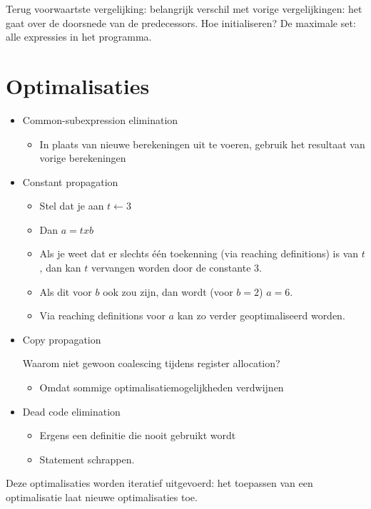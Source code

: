 Terug voorwaartste vergelijking: belangrijk verschil met vorige vergelijkingen: het gaat over de doorsnede van de predecessors. Hoe initialiseren? De maximale set: alle expressies in het programma.

\section{Optimalisaties}
\begin{itemize}
	\item Common-subexpression elimination
	\begin{itemize}
		\item In plaats van nieuwe berekeningen uit te voeren, gebruik het resultaat van vorige berekeningen
	\end{itemize}
	\item Constant propagation
	\begin{itemize}
		\item Stel dat je aan $t \leftarrow 3$
		\item Dan $a = t x b$
		\item Als je weet dat er slechts één toekenning (via reaching definitions) is van $t$, dan kan $t$ vervangen worden door de constante $3$.
		\item Als dit voor $b$ ook zou zijn, dan wordt (voor $b = 2$) $a = 6$.
		\item Via reaching definitions voor $a$ kan zo verder geoptimaliseerd worden.
		
	\end{itemize}
	\item Copy propagation
	\begin{itemize}
		\alert Waarom niet gewoon coalescing tijdens register allocation?
		\begin{itemize}
			\item Omdat sommige optimalisatiemogelijkheden  verdwijnen
		\end{itemize}
	\end{itemize}
	\item Dead code elimination
	\begin{itemize}
		\item Ergens een definitie die nooit gebruikt wordt
		\item Statement schrappen.
	\end{itemize}
\end{itemize}

Deze optimalisaties worden iteratief uitgevoerd: het toepassen van een optimalisatie laat nieuwe optimalisaties toe.

